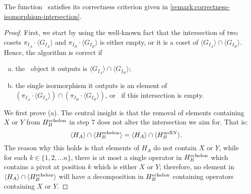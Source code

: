 \begin{lemma}
    The function \findisomorphismsetintersection~satisfies its correctness criterion given in 
    \cref{remark:correctness-isomorphism-intersection}.
\end{lemma}
\begin{proof}
    First, we start by using the well-known fact that the intersection of two cosets $\pi_{I_A} \cdot \langle G_{I_A} \rangle$ and $\pi_{I_B} \cdot \langle G_{I_B} \rangle$ is either empty, or it is a coset of $\langle G_{I_A} \rangle \cap \langle G_{I_B} \rangle$.
    Hence, the algorithm is correct if 
    \begin{enumerate}[(a)]
        \item the \automorphismgenerators~object it outputs is $\langle G_{I_A} \rangle \cap \langle G_{I_B} \rangle$;
        \item the single isormorphism it outputs is an element of $\left( \pi_{I_A} \cdot \langle G_{I_A} \rangle \right) \cap \left( \pi_{I_B} \cdot \langle G_{I_B} \rangle \right)$, or \none~if this intersection is empty.
    \end{enumerate}

    We first prove (a).
    The central insight is that the removal of elements containing $X$ or $Y$ from $H_B^{\textnormal{echelon}}$ in step 7 does not alter the intersection we aim for. That is:
    \begin{equation}
        \label{eq:noXY}
    \langle H_A \rangle \cap \langle H_B^{\textnormal{echelon}} \rangle = 
    \langle H_A \rangle \cap \langle H^{\textnormal{noXY}}_B \rangle
        .
    \end{equation}
    The reason why this holds is that elements of $H_A$ do not contain $X$ or $Y$, while for each $k \in \{1, 2, \dots n\}$, there is at most a single operator in $H_B^{\textnormal{echelon}}$ which contains a pivot at position $k$ which is either $X$ or $Y$; therefore, no element in $\langle H_A\rangle \cap \langle H_B^{\textnormal{echelon}}\rangle$ will have a decomposition in $H_B^{\textnormal{echelon}}$ containing operators containing $X$ or $Y$.


\end{proof}
